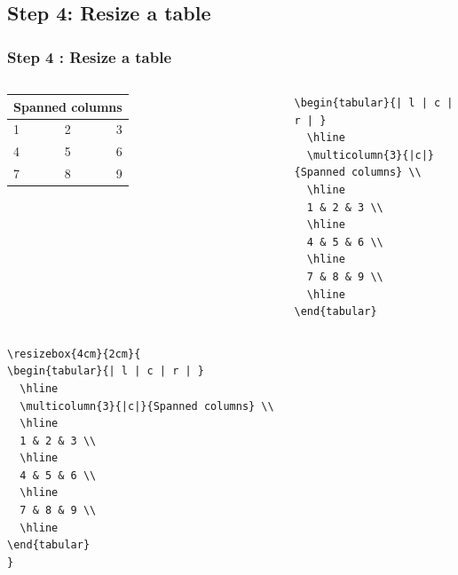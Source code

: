 \documentclass[article]{beamer}
\begin{document}
\subsection{Step 4: Resize a table}

\begin{frame}[fragile]
\frametitle{Step 4 : Resize a table }

\begin{columns}
  \begin{tabular}{| l | c | r | }
    \hline
    \multicolumn{3}{|c|}{Spanned columns} \\
    \hline
    1 & 2 & 3 \\ 
    \hline
    4 & 5 & 6 \\
    \hline 
    7 & 8 & 9 \\
    \hline
  \end{tabular}
	
\tiny{
	\begin{verbatim}
\begin{tabular}{| l | c | r | }
  \hline
  \multicolumn{3}{|c|}{Spanned columns} \\
  \hline
  1 & 2 & 3 \\ 
  \hline
  4 & 5 & 6 \\
  \hline 
  7 & 8 & 9 \\
  \hline
\end{tabular}
  \end{verbatim}
}
\end{columns}

\begin{columns}
	
\tiny{
	\begin{verbatim}
\resizebox{4cm}{2cm}{
\begin{tabular}{| l | c | r | }
  \hline
  \multicolumn{3}{|c|}{Spanned columns} \\
  \hline
  1 & 2 & 3 \\ 
  \hline
  4 & 5 & 6 \\
  \hline 
  7 & 8 & 9 \\
  \hline
\end{tabular}
}
  \end{verbatim}
}
\end{columns}


	
\end{frame}
\end{document}
